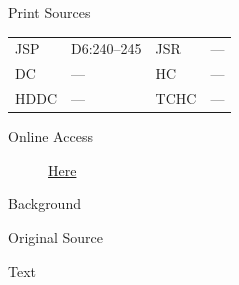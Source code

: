 			\begin{description}
					\item[Print Sources]
				\end{description}

					\begin{tabular}{p{0.5in}p{1in}p{0.5in}p{1in}}
					JSP	 	& D6:240--245		& JSR 		& --- \\
					DC	 	& ---		& HC 		& --- \\
					HDDC 	& ---		& TCHC 		& --- \\
					\end{tabular}
				
				\begin{description}
					\item[Online Access] \href{https://www.josephsmithpapers.org/paper-summary/letter-to-stephen-post-17-september-1838/1}{Here}
				\end{description}
				
				\begin{description}
					\item[Background]
				\end{description}
				
				
				\begin{description}
					\item[Original Source]
				\end{description}
				
				
				\begin{description}
					\item[Text]
				\end{description}
					
